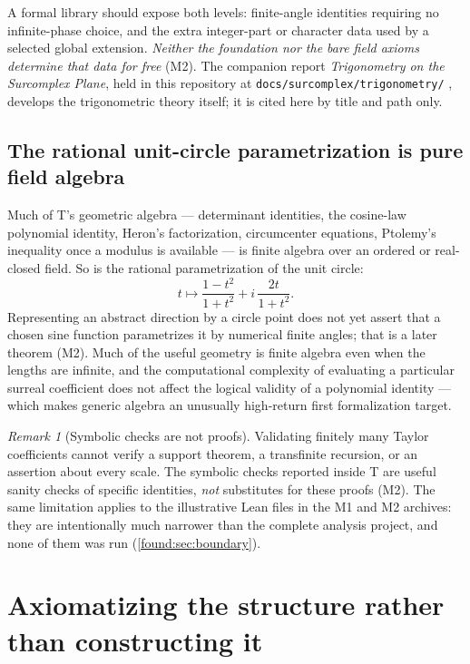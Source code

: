 \documentclass[11pt,letterpaper]{article}
\numberwithin{equation}{section}
\theoremstyle{definition}
\theoremstyle{remark}
\newtheorem{remark}[theorem]{Remark}
\begin{document}
A formal library should expose both levels: finite-angle identities requiring no
infinite-phase choice, and the extra integer-part or character data used by a
selected global extension. \emph{Neither the foundation nor the bare field
axioms determine that data for free} (M2). The companion report
\emph{Trigonometry on the Surcomplex Plane}, held in this repository at
\texttt{docs/surcomplex/trigonometry/} \cite{found:CompanionTrig}, develops the
trigonometric theory itself; it is cited here by title and path only.

\subsection{The rational unit-circle parametrization is pure field algebra}
\label{found:sub:rationalcircle}
Much of T's geometric algebra --- determinant identities, the cosine-law
polynomial identity, Heron's factorization, circumcenter equations, Ptolemy's
inequality once a modulus is available --- is finite algebra over an ordered or
real-closed field. So is the rational parametrization of the unit circle:
\begin{equation}\label{found:eq:rationalcircle}
 t\longmapsto\frac{1-t^2}{1+t^2}+i\,\frac{2t}{1+t^2}.
\end{equation}
Representing an abstract direction by a circle point does not yet assert that a
chosen sine function parametrizes it by numerical finite angles; that is a later
theorem (M2). Much of the useful geometry is finite algebra even when the
lengths are infinite, and the computational complexity of evaluating a
particular surreal coefficient does not affect the logical validity of a
polynomial identity --- which makes generic algebra an unusually high-return
first formalization target.

\begin{remark}[Symbolic checks are not proofs]\label{found:rem:symbolic}
Validating finitely many Taylor coefficients cannot verify a support theorem, a
transfinite recursion, or an assertion about every scale. The symbolic checks
reported inside T are useful sanity checks of specific identities, \emph{not}
substitutes for these proofs (M2). The same limitation applies to the
illustrative Lean files in the M1 and M2 archives: they are intentionally much
narrower than the complete analysis project, and none of them was run
(\cref{found:sec:boundary}).
\end{remark}

\section{Axiomatizing the structure rather than constructing it}
\label{found:sec:axioms}
\end{document}

